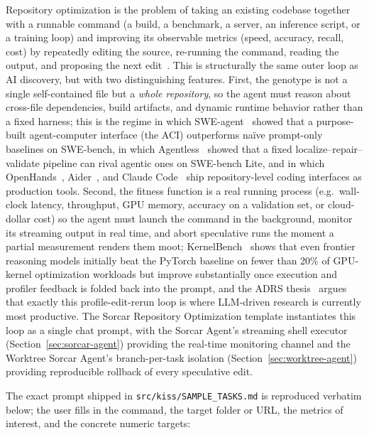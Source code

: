 \documentclass{article}
\begin{document}
Repository optimization is the problem of taking an existing codebase together with a runnable command (a build, a benchmark, a server, an inference script, or a training loop) and improving its observable metrics (speed, accuracy, recall, cost) by repeatedly editing the source, re-running the command, reading the output, and proposing the next edit~\citep{yang2024sweagent,xia2024agentless,jimenez2024swebench,ouyang2025kernelbench,wang2024openhands,aider2023,claudecode2025,cheng2025adrs}.  This is structurally the same outer loop as AI discovery, but with two distinguishing features.  First, the genotype is not a single self-contained file but a \emph{whole repository}, so the agent must reason about cross-file dependencies, build artifacts, and dynamic runtime behavior rather than a fixed harness; this is the regime in which SWE-agent~\citep{yang2024sweagent} showed that a purpose-built agent-computer interface (the ACI) outperforms naïve prompt-only baselines on SWE-bench, in which Agentless~\citep{xia2024agentless} showed that a fixed localize--repair--validate pipeline can rival agentic ones on SWE-bench Lite, and in which OpenHands~\citep{wang2024openhands}, Aider~\citep{aider2023}, and Claude Code~\citep{claudecode2025} ship repository-level coding interfaces as production tools.  Second, the fitness function is a real running process (e.g.\ wall-clock latency, throughput, GPU memory, accuracy on a validation set, or cloud-dollar cost) so the agent must launch the command in the background, monitor its streaming output in real time, and abort speculative runs the moment a partial measurement renders them moot; KernelBench~\citep{ouyang2025kernelbench} shows that even frontier reasoning models initially beat the PyTorch baseline on fewer than 20\% of GPU-kernel optimization workloads but improve substantially once execution and profiler feedback is folded back into the prompt, and the ADRS thesis~\citep{cheng2025adrs} argues that exactly this profile-edit-rerun loop is where LLM-driven research is currently most productive.  The Sorcar Repository Optimization template instantiates this loop as a single chat prompt, with the Sorcar Agent's streaming shell executor (Section~\ref{sec:sorcar-agent}) providing the real-time monitoring channel and the Worktree Sorcar Agent's branch-per-task isolation (Section~\ref{sec:worktree-agent}) providing reproducible rollback of every speculative edit.

The exact prompt shipped in \texttt{src/kiss/SAMPLE\_TASKS.md} is reproduced verbatim below; the user fills in the command, the target folder or URL, the metrics of interest, and the concrete numeric targets:
\end{document}
